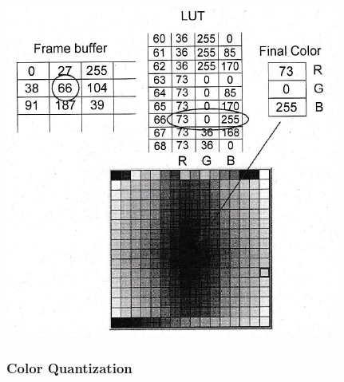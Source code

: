 \documentclass[12pt]{article}
\begin{document}
\includegraphics[scale=0.7]{3_64}

\subsubsection*{Color Quantization}
\end{document}

